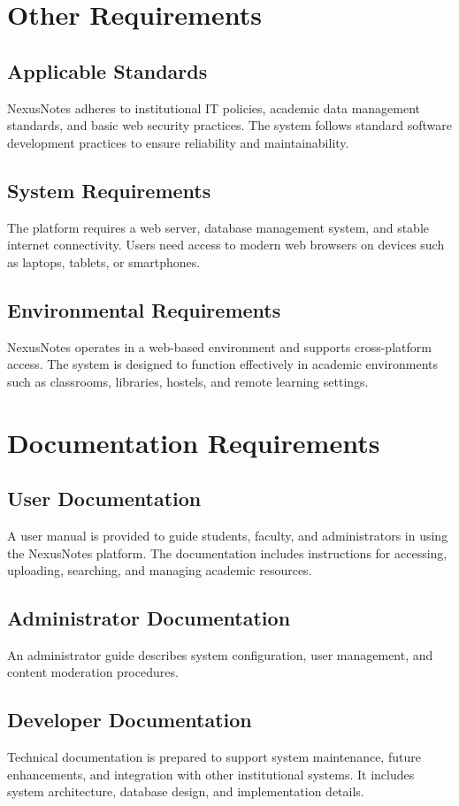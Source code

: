 \documentclass[12pt,a4paper]{report}
\begin{document}
\chapter{Other Requirements}

\section{Applicable Standards}
NexusNotes adheres to institutional IT policies, academic data management standards, and basic web security practices. The system follows standard software development practices to ensure reliability and maintainability.

\section{System Requirements}
The platform requires a web server, database management system, and stable internet connectivity. Users need access to modern web browsers on devices such as laptops, tablets, or smartphones.

\section{Environmental Requirements}
NexusNotes operates in a web-based environment and supports cross-platform access. The system is designed to function effectively in academic environments such as classrooms, libraries, hostels, and remote learning settings.

\chapter{Documentation Requirements}

\section{User Documentation}
A user manual is provided to guide students, faculty, and administrators in using the NexusNotes platform. The documentation includes instructions for accessing, uploading, searching, and managing academic resources.

\section{Administrator Documentation}
An administrator guide describes system configuration, user management, and content moderation procedures.

\section{Developer Documentation}
Technical documentation is prepared to support system maintenance, future enhancements, and integration with other institutional systems. It includes system architecture, database design, and implementation details.
\end{document}
